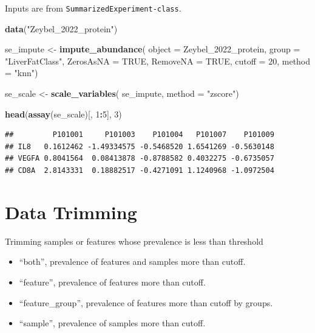 \documentclass[
]{book}
\newenvironment{Shaded}{\begin{snugshade}}{\end{snugshade}}
\newcommand{\AttributeTok}[1]{\textcolor[rgb]{0.13,0.29,0.53}{#1}}
\newcommand{\ConstantTok}[1]{\textcolor[rgb]{0.56,0.35,0.01}{#1}}
\newcommand{\DecValTok}[1]{\textcolor[rgb]{0.00,0.00,0.81}{#1}}
\newcommand{\FunctionTok}[1]{\textcolor[rgb]{0.13,0.29,0.53}{\textbf{#1}}}
\newcommand{\NormalTok}[1]{#1}
\newcommand{\OtherTok}[1]{\textcolor[rgb]{0.56,0.35,0.01}{#1}}
\newcommand{\SpecialCharTok}[1]{\textcolor[rgb]{0.81,0.36,0.00}{\textbf{#1}}}
\newcommand{\StringTok}[1]{\textcolor[rgb]{0.31,0.60,0.02}{#1}}
\begin{document}
Inputs are from \texttt{SummarizedExperiment-class}.

\begin{Shaded}
\begin{Highlighting}[]
\FunctionTok{data}\NormalTok{(}\StringTok{"Zeybel\_2022\_protein"}\NormalTok{)}

\NormalTok{se\_impute }\OtherTok{\textless{}{-}} \FunctionTok{impute\_abundance}\NormalTok{(}
  \AttributeTok{object =}\NormalTok{ Zeybel\_2022\_protein,}
  \AttributeTok{group =} \StringTok{"LiverFatClass"}\NormalTok{,}
  \AttributeTok{ZerosAsNA =} \ConstantTok{TRUE}\NormalTok{,}
  \AttributeTok{RemoveNA =} \ConstantTok{TRUE}\NormalTok{,}
  \AttributeTok{cutoff =} \DecValTok{20}\NormalTok{,}
  \AttributeTok{method =} \StringTok{"knn"}\NormalTok{)}

\NormalTok{se\_scale }\OtherTok{\textless{}{-}} \FunctionTok{scale\_variables}\NormalTok{(}
\NormalTok{  se\_impute,}
  \AttributeTok{method =} \StringTok{"zscore"}\NormalTok{)}

\FunctionTok{head}\NormalTok{(}\FunctionTok{assay}\NormalTok{(se\_scale)[, }\DecValTok{1}\SpecialCharTok{:}\DecValTok{5}\NormalTok{], }\DecValTok{3}\NormalTok{)}
\end{Highlighting}
\end{Shaded}

\begin{verbatim}
##         P101001     P101003    P101004   P101007    P101009
## IL8   0.1612462 -1.49334575 -0.5468520 1.6541269 -0.5630148
## VEGFA 0.8041564  0.08413878 -0.8788582 0.4032275 -0.6735057
## CD8A  2.8143331  0.18882517 -0.4271091 1.1240968 -1.0972504
\end{verbatim}

\hypertarget{data-trimming}{%
\section{Data Trimming}\label{data-trimming}}

Trimming samples or features whose prevalence is less than threshold

\begin{itemize}
\item
  ``both'', prevalence of features and samples more than cutoff.
\item
  ``feature'', prevalence of features more than cutoff.
\item
  ``feature\_group'', prevalence of features more than cutoff by groups.
\item
  ``sample'', prevalence of samples more than cutoff.
\end{itemize}
\end{document}
